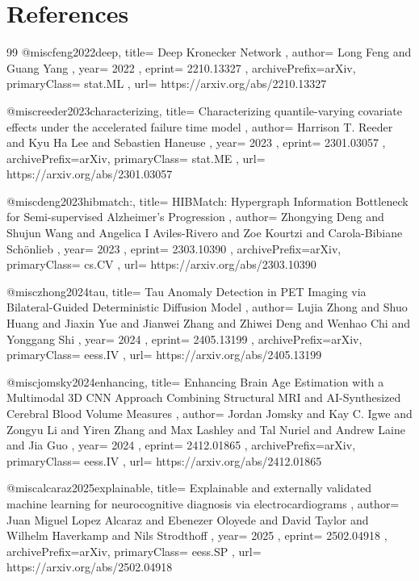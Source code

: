 \documentclass[11pt,a4paper]{article}
\begin{document}
\section*{References}
\begin{thebibliography}{99}
@misc{feng2022deep,
  title={ Deep Kronecker Network },
  author={ Long Feng and Guang Yang },
  year={ 2022 },
  eprint={ 2210.13327 },
  archivePrefix={arXiv},
  primaryClass={ stat.ML },
  url={ https://arxiv.org/abs/2210.13327 }
}


@misc{reeder2023characterizing,
  title={ Characterizing quantile-varying covariate effects under the accelerated failure time model },
  author={ Harrison T. Reeder and Kyu Ha Lee and Sebastien Haneuse },
  year={ 2023 },
  eprint={ 2301.03057 },
  archivePrefix={arXiv},
  primaryClass={ stat.ME },
  url={ https://arxiv.org/abs/2301.03057 }
}


@misc{deng2023hibmatch:,
  title={ HIBMatch: Hypergraph Information Bottleneck for Semi-supervised Alzheimer's Progression },
  author={ Zhongying Deng and Shujun Wang and Angelica I Aviles-Rivero and Zoe Kourtzi and Carola-Bibiane Schönlieb },
  year={ 2023 },
  eprint={ 2303.10390 },
  archivePrefix={arXiv},
  primaryClass={ cs.CV },
  url={ https://arxiv.org/abs/2303.10390 }
}


@misc{zhong2024tau,
  title={ Tau Anomaly Detection in PET Imaging via Bilateral-Guided Deterministic Diffusion Model },
  author={ Lujia Zhong and Shuo Huang and Jiaxin Yue and Jianwei Zhang and Zhiwei Deng and Wenhao Chi and Yonggang Shi },
  year={ 2024 },
  eprint={ 2405.13199 },
  archivePrefix={arXiv},
  primaryClass={ eess.IV },
  url={ https://arxiv.org/abs/2405.13199 }
}


@misc{jomsky2024enhancing,
  title={ Enhancing Brain Age Estimation with a Multimodal 3D CNN Approach Combining Structural MRI and AI-Synthesized Cerebral Blood Volume Measures },
  author={ Jordan Jomsky and Kay C. Igwe and Zongyu Li and Yiren Zhang and Max Lashley and Tal Nuriel and Andrew Laine and Jia Guo },
  year={ 2024 },
  eprint={ 2412.01865 },
  archivePrefix={arXiv},
  primaryClass={ eess.IV },
  url={ https://arxiv.org/abs/2412.01865 }
}


@misc{alcaraz2025explainable,
  title={ Explainable and externally validated machine learning for neurocognitive diagnosis via electrocardiograms },
  author={ Juan Miguel Lopez Alcaraz and Ebenezer Oloyede and David Taylor and Wilhelm Haverkamp and Nils Strodthoff },
  year={ 2025 },
  eprint={ 2502.04918 },
  archivePrefix={arXiv},
  primaryClass={ eess.SP },
  url={ https://arxiv.org/abs/2502.04918 }
}



\end{thebibliography}
\end{document}
